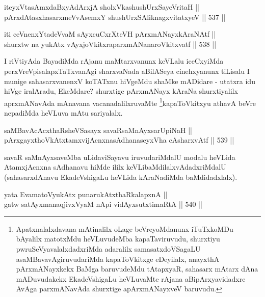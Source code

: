 
\begin{shl}
iteyxVtasAmxdaBxyAdArxjA sholxVkashushUrxSayeVritaH || \\
pArxdAtasxhasarxmeVvAsemxY shushUrxSAliknagxvitatxyeV \hfill || 537 ||  
\end{shl}

\begin{shl}
iti ceVnenxYtadeVvaM sAyxcuCxrXteVH pArxmANayxkAraNAtf || \\
shurxtw na yukAtx vAyxjoVkitxraparxmANanaroVkitxvatf \hfill || 538 ||  
\end{shl}

\begin{artha}
I riVtiyAda BayadiMda rAjanu maMtarxvanunx keVLalu iceCxyiMda
perxVreVpisalapxTaTxvanAgi sharxvaNada aBilASeya cinehxyanunx tiLisalu
I munige sahasarxvanenxV koTATxnu hiVgeMdu shaMke mADidare - utatxra
idu hiVge iralAradu, EkeMdare? shurxtige pArxmANayx kAraNa
shurxtiyalilx aprxmANavAda mAnavana vacanadalilxruvaMte \footnote{Apatxnalalxdavana mAtinalilx oLage
beVreyoMdanunx iTuTxkoMDu bAyalilx matotxMdu heVLuvudeMba
kapaTaviruvudu, shurxtiyu pwruSeVyavalalxdadxriMda adaralilx
samasatxdoVSagaLU asaMBavavAgiruvudariMda kapaToVkitxge eDeyilalx,
anayxthA pArxmANayxkekx BaMga baruvudeMdu tAtapxyaR, sahasarx mAtarx
dAna mADuvudakekx EkadeVshigaLu heVLuvaMte rAjana aBipArxyavidadxre
AvAga parxmANavAda shurxtige apArxmANayxveV baruvudu.}kapaToVkitxyu athavA beVre nepadiMda
heVLuva mAtu sariyalalx.
\end{artha}


\begin{shl}
saMBavAcAcxthaRsheVSasayx savaRsaMnAyxsarUpiNaH || \\
pArxgayxthoVkAtxtamxvijAcnxnasAdhanaseyxVha cAsharxvAtf \hfill || 539 ||  
\end{shl}

\begin{artha}
savaR saMnAyxsaveMba uLidaviSayavu iruvudariMdalU modalu heVLida
AtamxjAcnxna sAdhanavu hiMde ililx keVLibaMdilalxvAdadxriMdalU
(sahasarxdAnavu EkadeVshigaLu heVLida kAraNadiMda baMdidadxlalx).
\end{artha}

\begin{shl}
yata EvamatoV\s yukAtx punarukAtxthaRkalapxnA || \\
\footnotemark[2]gatw satAyxmanaqjivxVyaM nApi vidAyxsutxtimaRtA \hfill || 540 ||  
\end{shl}

